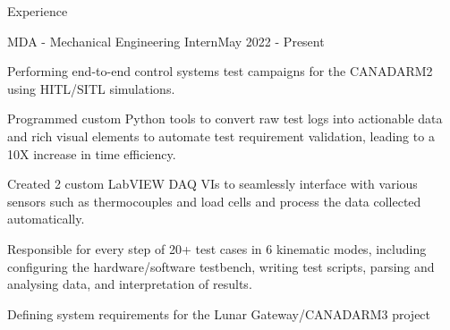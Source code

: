 \documentclass{resume} %
\begin{document}

\begin{rSection}{Experience}

\begin{rSubsection}{MDA - Mechanical Engineering Intern}{May 2022 - Present}{}{}

\item Performing end-to-end control systems test campaigns for the CANADARM2 using HITL/SITL simulations.
\item Programmed custom Python tools to convert raw test logs into actionable data and rich visual elements to automate test requirement validation, leading to a 10X increase in time efficiency.
\item Created 2 custom LabVIEW DAQ VIs to seamlessly interface with various sensors such as thermocouples and load cells and process the data collected automatically.
\item Responsible for every step of 20+ test cases in 6 kinematic modes, including configuring the hardware/software testbench, writing test scripts, parsing and analysing data, and interpretation of results.
\item Defining system requirements for the Lunar Gateway/CANADARM3 project

\end{rSubsection}

\begin{comment}

\begin{rSubsection}{Propulsion and Payload Engineer}{September 2021 - Present}{Queen's Rocket Engineering Team}{}
\item Designing the team's first 3D-printed Hybrid Rocket Engine to compete in the SA Cup 10,000ft SRAD category
\item Created Standard Operating Procedures (SOP) documentation in LaTeX for the safe operation of a cold-flow and hot-fire test, complete with hazard assessment, risk mitigation, and contingency planning
\item Designing an autonomous glider payload to be launched from the rocket at apogee and collect atmospheric data, controlled by ArduPilot


\end{comment}
\end{rSection}
\end{document}
